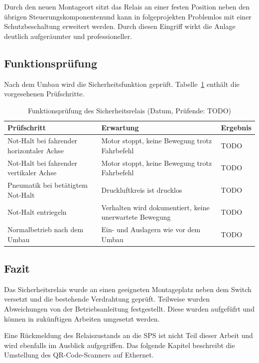 Durch den neuen Montageort sitzt das Relais an einer festen Position neben den übrigen Steuerungskomponentenund kann in folgeprojekten Problemlos mit einer Schutzbeschaltung erweitert werden. Durch diesen Eingriff wirkt die Anlage deutlich aufgeräumter und professioneller. 

\subsection{Funktionsprüfung}

Nach dem Umbau wird die Sicherheitsfunktion geprüft. Tabelle~\ref{tab:pnoz_test} enthält die vorgesehenen Prüfschritte.

\begin{table}[H]
  \centering
  \caption{Funktionsprüfung des Sicherheitsrelais (Datum, Prüfende: TODO)}
  \label{tab:pnoz_test}
  \begin{tabular}{|p{5.2cm}|p{6.2cm}|l|}
    \hline
    \textbf{Prüfschritt} & \textbf{Erwartung} & \textbf{Ergebnis} \\ \hline
    Not-Halt bei fahrender horizontaler Achse & Motor stoppt, keine Bewegung trotz Fahrbefehl & TODO \\ \hline
    Not-Halt bei fahrender vertikaler Achse & Motor stoppt, keine Bewegung trotz Fahrbefehl & TODO \\ \hline
    Pneumatik bei betätigtem Not-Halt & Druckluftkreis ist drucklos & TODO \\ \hline
    Not-Halt entriegeln & Verhalten wird dokumentiert, keine unerwartete Bewegung & TODO \\ \hline
    Normalbetrieb nach dem Umbau & Ein- und Auslagern wie vor dem Umbau & TODO \\ \hline
  \end{tabular}
\end{table}

\subsection{Fazit}

Das Sicherheitsrelais wurde an einen geeigneten Montageplatz neben dem Switch versetzt und die bestehende Verdrahtung geprüft. 
Teilweise wurden Abweichungen von der Betriebsanleitung festgestellt. Diese wurden aufgefüfrt und können in zukünftigen Arbeiten umgesetzt werden.

Eine Rückmeldung des Relaiszustands an die SPS ist nicht Teil dieser Arbeit und wird ebenfalls im Ausblick aufgegriffen. Das folgende Kapitel beschreibt die Umstellung des QR-Code-Scanners auf Ethernet.
